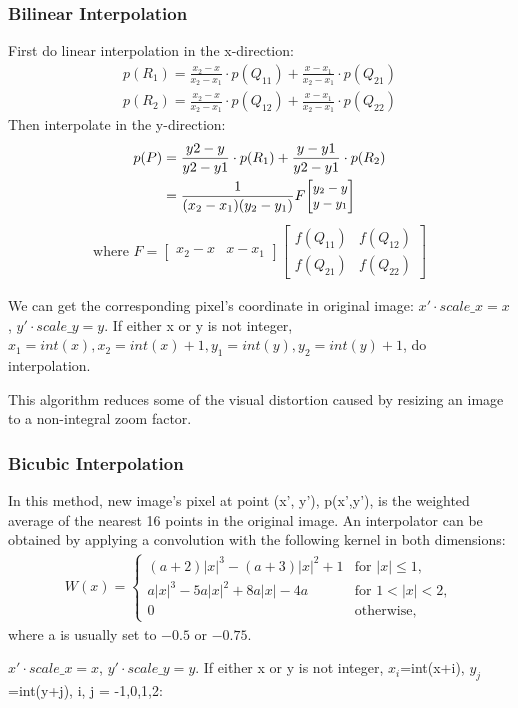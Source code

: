 \documentclass[journal,conference]{IEEEtran}
\begin{document}
\subsubsection{Bilinear Interpolation}
\par First do linear interpolation in the x-direction:
\begin{align*}
p(R_1) = \frac{x_2-x}{x_2-x_1}\cdot p(Q_{11})+\frac{x-x_1}{x_2-x_1}\cdot p(Q_{21})\\
p(R_2) = \frac{x_2-x}{x_2-x_1}\cdot p(Q_{12})+\frac{x-x_1}{x_2-x_1}\cdot p(Q_{22})
\end{align*}
Then interpolate in the y-direction:
\begin{align*}
p(P) &= \frac{y2-y}{y2-y1}\cdot p(R_1)+\frac{y-y1}{y2-y1}\cdot p(R_2)\\ &=\small{\frac {1}{(x_{2}-x_{1})(y_{2}-y_{1})}} F {\begin{bmatrix}y_{2}-y\\y-y_{1}\end{bmatrix}} \\
\end{align*}
\begin{align*}
\text{where } F = {\begin{bmatrix}x_{2}-x&x-x_{1}\end{bmatrix}}{\begin{bmatrix}f(Q_{11})&f(Q_{12})\\f(Q_{21})&f(Q_{22})\end{bmatrix}}
\end{align*}
\par We can get the corresponding pixel's coordinate in original image: $x'\cdot scale\_x=x$, $y'\cdot scale\_y=y$. If either x or y is not integer, $x_1=int(x),x_2=int(x)+1,y_1=int(y), y_2=int(y)+1$, do interpolation.
\par This algorithm reduces some of the visual distortion caused by resizing an image to a non-integral zoom factor.

\subsubsection{Bicubic Interpolation}
In this method, new image’s pixel at point (x', y'), p(x',y'), is the weighted average of the nearest 16 points in the original image. An interpolator can be obtained by applying a convolution with the following kernel in both dimensions:
\begin{align*}
{\displaystyle W(x)={\begin{cases}(a+2)|x|^{3}-(a+3)|x|^{2}+1&{\text{for }}|x|\leq 1,\\a|x|^{3}-5a|x|^{2}+8a|x|-4a&{\text{for }}1<|x|<2,\\0&{\text{otherwise}},\end{cases}}}
\end{align*}
where a is usually set to $-0.5$ or $-0.75$.
\par $x'\cdot scale\_x=x$, $y'\cdot scale\_y=y$. If either x or y is not integer, $x_i$=int(x+i), $y_j$=int(y+j), i, j = -1,0,1,2:
\end{document}
